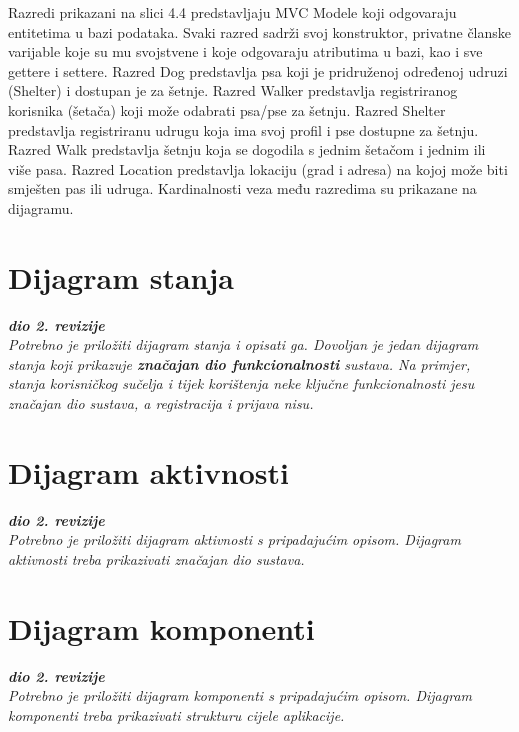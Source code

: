 			
		Razredi prikazani na slici 4.4 predstavljaju MVC Modele koji odgovaraju entitetima u bazi podataka. Svaki razred sadrži svoj konstruktor, privatne članske varijable koje su mu svojstvene i koje odgovaraju atributima u bazi, kao i sve gettere i settere.
		Razred Dog predstavlja psa koji je pridruženoj određenoj udruzi (Shelter) i dostupan je za šetnje. Razred Walker predstavlja registriranog korisnika (šetača) koji može odabrati psa/pse za šetnju. Razred Shelter predstavlja registriranu udrugu koja ima svoj profil i pse dostupne za šetnju. Razred Walk predstavlja šetnju koja se dogodila s jednim šetačom i jednim ili više pasa. Razred Location predstavlja lokaciju (grad i adresa) na kojoj može biti smješten pas ili udruga. Kardinalnosti veza među razredima su prikazane na dijagramu.
			
			

			
			\eject
		
		\section{Dijagram stanja}
			
			
			\textbf{\textit{dio 2. revizije}}\\
			
			\textit{Potrebno je priložiti dijagram stanja i opisati ga. Dovoljan je jedan dijagram stanja koji prikazuje \textbf{značajan dio funkcionalnosti} sustava. Na primjer, stanja korisničkog sučelja i tijek korištenja neke ključne funkcionalnosti jesu značajan dio sustava, a registracija i prijava nisu. }
			
			
			\eject 
		
		\section{Dijagram aktivnosti}
			
			\textbf{\textit{dio 2. revizije}}\\
			
			 \textit{Potrebno je priložiti dijagram aktivnosti s pripadajućim opisom. Dijagram aktivnosti treba prikazivati značajan dio sustava.}
			
			\eject
		\section{Dijagram komponenti}
		
			\textbf{\textit{dio 2. revizije}}\\
		
			 \textit{Potrebno je priložiti dijagram komponenti s pripadajućim opisom. Dijagram komponenti treba prikazivati strukturu cijele aplikacije.}